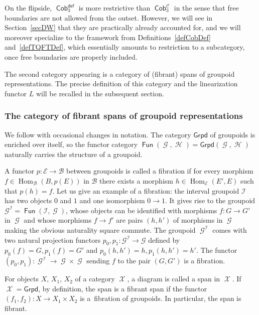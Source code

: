 \documentclass[10pt,a4paper]{amsart}
\DeclareMathOperator{\Hom}{Hom}
\DeclareMathOperator{\Fun}{\mathsf{Fun}}
\DeclareMathOperator{\Cob}{\mathsf{Cob}}
\DeclareMathOperator{\calc}{\mathcal{C}}
\DeclareMathOperator{\calx}{\mathcal{X}}
\DeclareMathOperator{\calg}{\mathcal{G}}
\DeclareMathOperator{\calh}{\mathcal{H}}
\DeclareMathOperator{\cali}{\mathcal{I}}
\numberwithin{equation}{section}
\theoremstyle{definition}
\begin{document}
On the flipside, $\Cob_3^{\mathsf{def}}$ is more restrictive than $\Cob_3^{\calc}$ in the sense that free boundaries are not allowed from the outset. However, we will see in Section~\ref{secDW} that they are practically already accounted for, and we will moreover specialize to the framework from Definitions~\ref{defCobDef} and~\ref{defTQFTDef}, which essentially amounts to restriction to a subcategory, once free boundaries are properly included.

The second category appearing is a category of (fibrant) spans of groupoid representations. The precise definition of this category and the linearization functor $L$ will be recalled in the subsequent section.

\subsubsection{The category of fibrant spans of groupoid representations}
We follow \cite[Section~2]{FMM} with occasional changes in notation.
The category $\mathsf{Grpd}$ of groupoids is enriched over itself, so the functor category $\Fun(\calg, \calh) = \mathsf{Grpd}(\calg, \calh)$ naturally carries the structure of a groupoid.

A functor $p\colon \mathcal{E} \rightarrow \mathcal{B}$ between groupoids is called a fibration if for every morphism $f \in \Hom_{\mathcal{B}}(B, p(E))$ in $\mathcal{B}$ there exists a morphism $h \in \Hom_{\mathcal{E}}(E', E)$ such that $p(h) = f$. Let us give an example of a fibration: the interval groupoid $\mathcal{I}$ has two objects $0$ and $1$ and one isomorphism ${0 \rightarrow 1}$. It gives rise to the groupoid $\mathcal{G}^{\mathcal{I}} = \Fun(\mathcal{I}, \calg)$, whose objects can be identified with morphisms $f\colon G \rightarrow G'$ in $\calg$ and whose morphisms $f \rightarrow f'$ are pairs $(h, h')$ of morphisms in $\calg$ making the obvious naturality square commute. The groupoid $\calg^{\mathcal{I}}$ comes with two natural projection functors $p_0, p_1\colon \mathcal{G}^{\mathcal{I}} \rightarrow \mathcal{G}$ defined by $p_0(f) = G, p_1(f) = G'$ and $p_0(h, h') = h, p_1(h, h') = h'$. The functor $(p_0, p_1)\colon \calg^{\cali} \rightarrow \calg \times \calg$ sending $f$ to the pair $(G, G')$ is a fibration.

For objects $X$, $X_1$, $X_2$ of a category $\calx$, a diagram  is called a span in $\calx$. If $\calx = \mathsf{Grpd}$, by definition, the span is a fibrant span if the functor $(f_1, f_2)\colon X \rightarrow X_1 \times X_2$ is a~fibration of groupoids. In particular, the span \smash{$\calg \xleftarrow{p_0} \calg^{\cali} \xrightarrow{p_1} \calg$} is fibrant.
\end{document}
